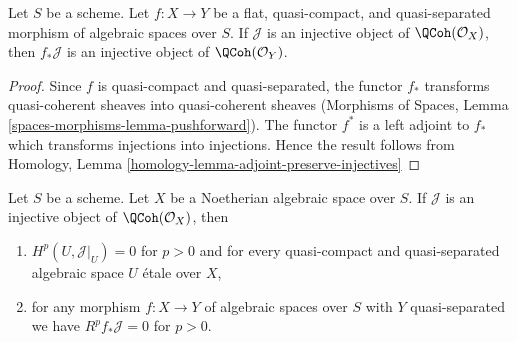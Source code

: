 \begin{lemma}
\label{lemma-flat-pullback-injective-quasi-coherent}
Let $S$ be a scheme. Let $f : X \to Y$ be a flat, quasi-compact, and
quasi-separated morphism of algebraic spaces over $S$. If
$\mathcal{J}$ is an injective object of $\QCoh(\mathcal{O}_X)$,
then $f_*\mathcal{J}$ is an injective object of
$\QCoh(\mathcal{O}_Y)$.
\end{lemma}

\begin{proof}
Since $f$ is quasi-compact and quasi-separated, the functor
$f_*$ transforms quasi-coherent sheaves into quasi-coherent sheaves
(Morphisms of Spaces, Lemma \ref{spaces-morphisms-lemma-pushforward}).
The functor $f^*$ is a left adjoint to $f_*$ which
transforms injections into injections.
Hence the result follows from
Homology, Lemma \ref{homology-lemma-adjoint-preserve-injectives}
\end{proof}

\begin{lemma}
\label{lemma-injective-pushforward}
Let $S$ be a scheme. Let $X$ be a Noetherian algebraic space over $S$. If
$\mathcal{J}$ is an injective object of $\QCoh(\mathcal{O}_X)$,
then
\begin{enumerate}
\item $H^p(U, \mathcal{J}|_U) = 0$ for $p > 0$ and for
every quasi-compact and quasi-separated algebraic space $U$ \'etale over $X$,
\item for any morphism $f : X \to Y$ of algebraic spaces over $S$
with $Y$ quasi-separated we have $R^pf_*\mathcal{J} = 0$ for $p > 0$.
\end{enumerate}
\end{lemma}

